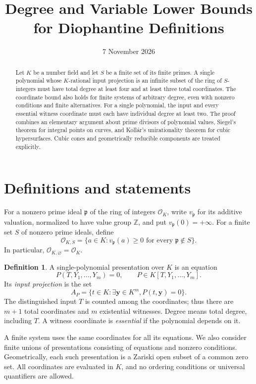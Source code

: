 \documentclass[11pt,a4paper]{article}
\title{Degree and Variable Lower Bounds\\for Diophantine Definitions}
\author{}
\date{7 November 2026}
\theoremstyle{definition}
\newtheorem{definition}[theorem]{Definition}
\newcommand{\OKS}{\mathcal O_{K,S}}
\begin{document}
\maketitle
\begin{abstract}
Let $K$ be a number field and let $S$ be a finite set of its finite
primes. A single polynomial whose $K$-rational input projection is
an infinite subset of the ring of $S$-integers must have total
degree at least four and at least three total coordinates. The
coordinate bound also holds for finite systems of arbitrary degree,
even with nonzero conditions and finite alternatives. For a single
polynomial, the input and every essential witness coordinate must
each have individual degree at least two. The proof combines an
elementary argument about prime divisors of polynomial values,
Siegel's theorem for integral points on curves, and Koll\'ar's
unirationality theorem for cubic hypersurfaces. Cubic cones and
geometrically reducible components are treated explicitly.
\end{abstract}

\section{Definitions and statements}

For a nonzero prime ideal $\mathfrak p$ of the ring of integers
$\mathcal O_K$, write $v_{\mathfrak p}$ for its additive valuation,
normalized to have value group $\mathbb Z$, and put
$v_{\mathfrak p}(0)=+\infty$. For a finite set $S$ of nonzero
prime ideals, define
\[
 \OKS=\{a\in K: v_{\mathfrak p}(a)\ge0
                       \text{ for every }\mathfrak p\notin S\}.
\]
In particular, $\mathcal O_{K,\varnothing}=\mathcal O_K$.

\begin{definition}
A single-polynomial presentation over $K$ is an equation
\[
                P(T,Y_1,\ldots,Y_m)=0,
       \qquad P\in K[T,Y_1,\ldots,Y_m].
\]
Its \emph{input projection} is the set
\[
 A_P=\{t\in K:\exists \mathbf y\in K^m, P(t,\mathbf y)=0\}.
\]
The distinguished input $T$ is counted among the coordinates; thus
there are $m+1$ total coordinates and $m$ existential witnesses.
Degree means total degree, including $T$. A witness coordinate is
\emph{essential} if the polynomial depends on it.
\end{definition}

A finite system uses the same coordinates for all its equations.
We also consider finite unions of presentations consisting of equations
and nonzero conditions. Geometrically, each such presentation is a
Zariski open subset of a common zero set. All coordinates are evaluated
in $K$, and no ordering conditions or universal quantifiers are allowed.
\end{document}
